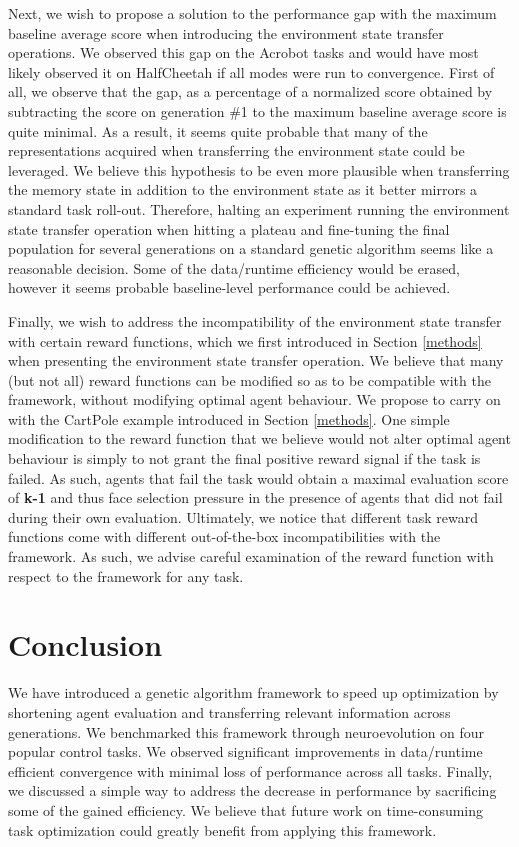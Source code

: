 \documentclass[dvipsnames,format=sigconf,anonymous=false,review=false]{acmart}
\begin{document}
Next, we wish to propose a solution to the performance gap with the maximum baseline average score when introducing the environment state transfer operations. We observed this gap on the Acrobot tasks and would have most likely observed it on HalfCheetah if all modes were run to convergence. First of all, we observe that the gap, as a percentage of a normalized score obtained by subtracting the score on generation \#1 to the maximum baseline average score is quite minimal. As a result, it seems quite probable that many of the representations acquired when transferring the environment state could be leveraged. We believe this hypothesis to be even more plausible when transferring the memory state in addition to the environment state as it better mirrors a standard task roll-out. Therefore, halting an experiment running the environment state transfer operation when hitting a plateau and fine-tuning the final population for several generations on a standard genetic algorithm seems like a reasonable decision. Some of the data/runtime efficiency would be erased, however it seems probable baseline-level performance could be achieved.

Finally, we wish to address the incompatibility of the environment state transfer with certain reward functions, which we first introduced in Section \ref{methods} when presenting the environment state transfer operation. We believe that many (but not all) reward functions can be modified so as to be compatible with the framework, without modifying optimal agent behaviour. We propose to carry on with the CartPole example introduced in Section \ref{methods}. One simple modification to the reward function that we believe would not alter optimal agent behaviour is simply to not grant the final positive reward signal if the task is failed. As such, agents that fail the task would obtain a maximal evaluation score of \textbf{k-1} and thus face selection pressure in the presence of agents that did not fail during their own evaluation. Ultimately, we notice that different task reward functions come with different out-of-the-box incompatibilities with the framework. As such, we advise careful examination of the reward function with respect to the framework for any task.
\\
\vspace{-1em}
\section{Conclusion}

We have introduced a genetic algorithm framework to speed up optimization by shortening agent evaluation and transferring relevant information across generations. We benchmarked this framework through neuroevolution on four popular control tasks. We observed significant improvements in data/runtime efficient convergence with minimal loss of performance across all tasks. Finally, we discussed a simple way to address the decrease in performance by sacrificing some of the gained efficiency. We believe that future work on time-consuming task optimization could greatly benefit from applying this framework. 







\renewcommand*{\bibfont}{\scriptsize}

{\footnotesize
}
\vspace{-3em}
\end{document}
